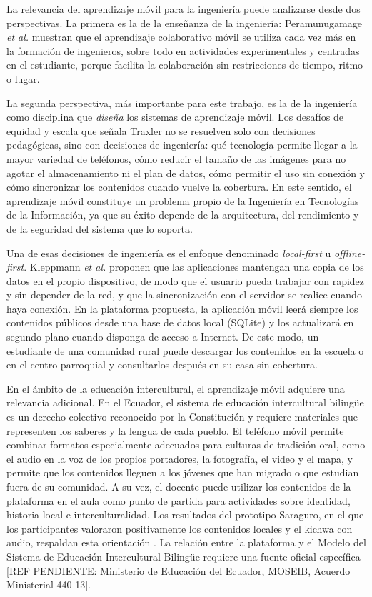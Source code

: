 La relevancia del aprendizaje móvil para la ingeniería puede analizarse desde dos perspectivas. La primera es la de la enseñanza de la ingeniería: Peramunugamage \textit{et al.} \cite{peramunugamage2023engineering} muestran que el aprendizaje colaborativo móvil se utiliza cada vez más en la formación de ingenieros, sobre todo en actividades experimentales y centradas en el estudiante, porque facilita la colaboración sin restricciones de tiempo, ritmo o lugar.

La segunda perspectiva, más importante para este trabajo, es la de la ingeniería como disciplina que \textit{diseña} los sistemas de aprendizaje móvil. Los desafíos de equidad y escala que señala Traxler \cite{traxler2009mobile} no se resuelven solo con decisiones pedagógicas, sino con decisiones de ingeniería: qué tecnología permite llegar a la mayor variedad de teléfonos, cómo reducir el tamaño de las imágenes para no agotar el almacenamiento ni el plan de datos, cómo permitir el uso sin conexión y cómo sincronizar los contenidos cuando vuelve la cobertura. En este sentido, el aprendizaje móvil constituye un problema propio de la Ingeniería en Tecnologías de la Información, ya que su éxito depende de la arquitectura, del rendimiento y de la seguridad del sistema que lo soporta.

Una de esas decisiones de ingeniería es el enfoque denominado \textit{local-first} u \textit{offline-first}. Kleppmann \textit{et al.} \cite{kleppmann2019local} proponen que las aplicaciones mantengan una copia de los datos en el propio dispositivo, de modo que el usuario pueda trabajar con rapidez y sin depender de la red, y que la sincronización con el servidor se realice cuando haya conexión. En la plataforma propuesta, la aplicación móvil leerá siempre los contenidos públicos desde una base de datos local (SQLite) y los actualizará en segundo plano cuando disponga de acceso a Internet. De este modo, un estudiante de una comunidad rural puede descargar los contenidos en la escuela o en el centro parroquial y consultarlos después en su casa sin cobertura.

En el ámbito de la educación intercultural, el aprendizaje móvil adquiere una relevancia adicional. En el Ecuador, el sistema de educación intercultural bilingüe es un derecho colectivo reconocido por la Constitución \cite{ecuador2008constitucion} y requiere materiales que representen los saberes y la lengua de cada pueblo. El teléfono móvil permite combinar formatos especialmente adecuados para culturas de tradición oral, como el audio en la voz de los propios portadores, la fotografía, el video y el mapa, y permite que los contenidos lleguen a los jóvenes que han migrado o que estudian fuera de su comunidad. A su vez, el docente puede utilizar los contenidos de la plataforma en el aula como punto de partida para actividades sobre identidad, historia local e interculturalidad. Los resultados del prototipo Saraguro, en el que los participantes valoraron positivamente los contenidos locales y el kichwa con audio, respaldan esta orientación \cite{quezada2026mobile}. La relación entre la plataforma y el Modelo del Sistema de Educación Intercultural Bilingüe requiere una fuente oficial específica [REF PENDIENTE: Ministerio de Educación del Ecuador, MOSEIB, Acuerdo Ministerial 440-13].

